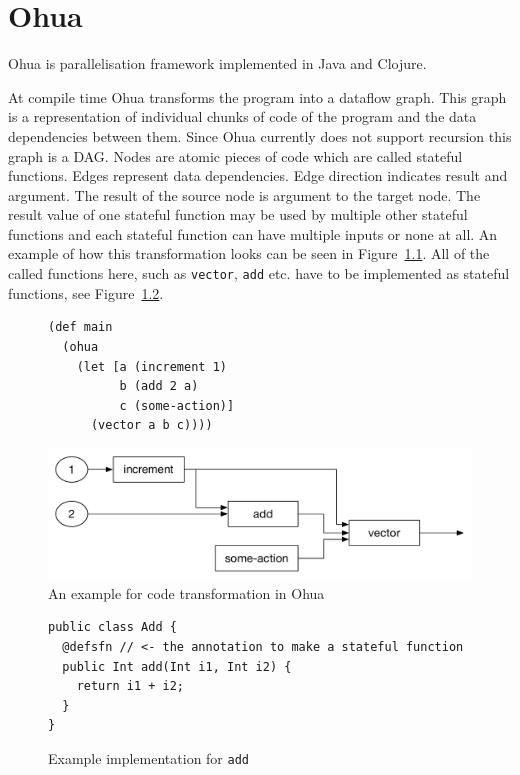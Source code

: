 \chapter{Ohua}

\label{ch:Ohua}

Ohua\cite{Ertel:2015:OID:2807426.2807431}\cite{Ohua:library:link} is parallelisation framework implemented in Java\cite{JavaLanguage} and Clojure\cite{ClojureLanguage}.

At compile time Ohua transforms the program into a dataflow graph.
This graph is a representation of individual chunks of code of the program and the data dependencies between them.
Since Ohua currently does not support recursion this graph is a DAG.
Nodes are atomic pieces of code which are called stateful functions.
Edges represent data dependencies.
Edge direction indicates result and argument.
The result of the source node is argument to the target node.
The result value of one stateful function may be used by multiple other stateful functions and each stateful function can have multiple inputs or none at all.
An example of how this transformation looks can be seen in Figure~\ref{fig:ohua-code-example}.
All of the called functions here, such as \texttt{vector}, \texttt{add} etc. have to be implemented as stateful functions, see Figure~\ref{fig:ohua-sfn-example}.

\begin{figure}[h]
\begin{verbatim}
(def main
  (ohua
    (let [a (increment 1)
          b (add 2 a)
          c (some-action)]
      (vector a b c))))
\end{verbatim}
\includegraphics[width=\linewidth]{../Figures/ohua-code-example}
\caption{An example for code transformation in Ohua}
\label{fig:ohua-code-example}
\end{figure}

\begin{figure}[h]
\begin{verbatim}
public class Add {
  @defsfn // <- the annotation to make a stateful function
  public Int add(Int i1, Int i2) {
    return i1 + i2;
  }
}
\end{verbatim}
\caption{Example implementation for \texttt{add}}
\label{fig:ohua-sfn-example}
\end{figure}

